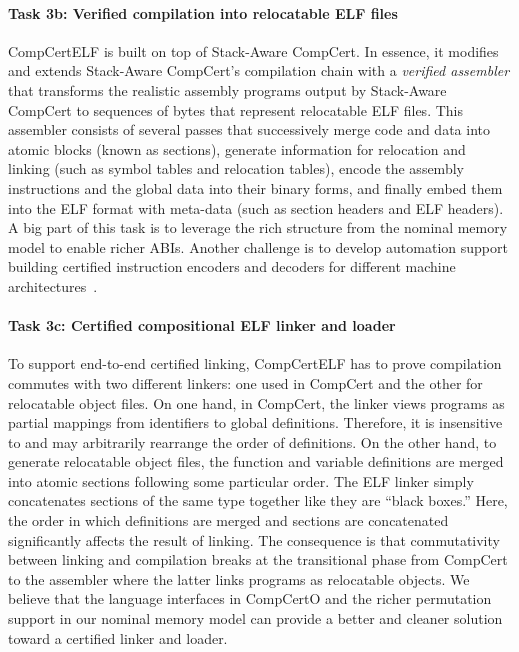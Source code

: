 \vspace*{-2ex}
\paragraph*{Task 3b: Verified compilation into relocatable ELF files}
CompCertELF is built on top of Stack-Aware CompCert. In essence, it
modifies and extends Stack-Aware CompCert's compilation chain with a
\emph{verified assembler} that transforms the realistic assembly
programs output by Stack-Aware CompCert to sequences of bytes that
represent relocatable ELF files.  This assembler consists of several
passes that successively merge code and data into atomic blocks (known
as sections), generate information for relocation and linking (such as
symbol tables and relocation tables), encode the assembly instructions
and the global data into their binary forms, and finally embed them
into the ELF format with meta-data (such as section headers and ELF
headers). A big part of this task is to leverage the rich structure
from the nominal memory model to enable richer ABIs.  Another
challenge is to develop automation support building certified
instruction encoders and decoders for different machine
architectures~\cite{xu21}.

\vspace*{-2ex}
\paragraph*{Task 3c: Certified compositional ELF linker and loader}
To support end-to-end certified linking, CompCertELF has to prove
compilation commutes with two different linkers: one used in CompCert
and the other for relocatable object files. On one hand, in CompCert,
the linker views programs as partial mappings from identifiers to
global definitions. Therefore, it is insensitive to and may
arbitrarily rearrange the order of definitions. On the other hand, to
generate relocatable object files, the function and variable
definitions are merged into atomic sections following some particular
order. The ELF linker simply concatenates sections of the same type
together like they are ``black boxes.''  Here, the order in which
definitions are merged and sections are concatenated significantly
affects the result of linking.  The consequence is that commutativity
between linking and compilation breaks at the transitional phase from
CompCert to the assembler where the latter links programs as
relocatable objects. We believe that the language interfaces in
CompCertO and the richer permutation support in our nominal memory
model can provide a better and cleaner solution toward a certified
linker and loader.

